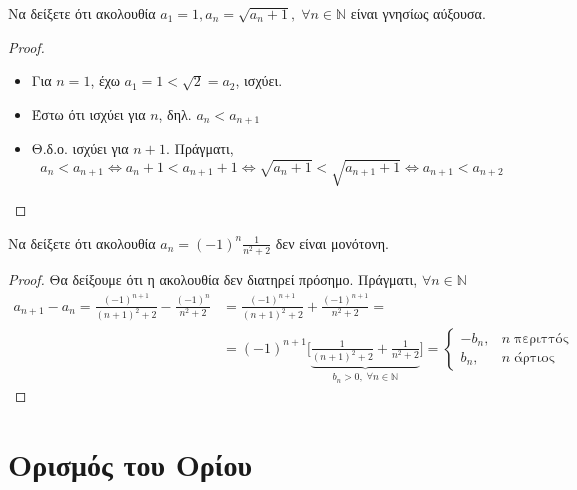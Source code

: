\begin{enumerate}
  \item Να δείξετε ότι ακολουθία $ a_{1}=1, a_{n} = \sqrt{a_{n}+1}, \; 
    \forall n \in \mathbb{N}$ είναι γνησίως αύξουσα.
    \begin{proof}
      \begin{itemize}
        \item Για $ n=1 $, έχω $ a_{1}=1 < \sqrt{2} = a_{2} $, ισχύει.
        \item Έστω ότι ισχύει για $n$, δηλ. $ a_{n}< a_{n+1} $
        \item Θ.δ.ο. ισχύει για $ n+1 $. Πράγματι,
          \[
            a_{n} < a_{n+1} \Leftrightarrow a_{n}+1 < a_{n+1}+1 
            \Leftrightarrow \sqrt{a_{n}+1} < \sqrt{a_{n+1}+1} 
            \Leftrightarrow a_{n+1}< a_{n+2}
          \] 
      \end{itemize}
    \end{proof}

  \item Να δείξετε ότι ακολουθία $ a_{n} = (-1)^{n} \frac{1}{n^{2}+2} $ 
    δεν είναι μονότονη.
    \begin{proof}
    \item {}
      Θα δείξουμε ότι η ακολουθία δεν διατηρεί πρόσημο. Πράγματι, 
      $ \forall n \in \mathbb{N} $
      \begin{align*}
        a_{n+1}- a_{n} = \frac{(-1)^{n+1}}{(n+1)^{2}+2} - 
        \frac{(-1)^{n}} {n^{2}+2} 
                        &= \frac{(-1)^{n+1}}{(n+1)^{2}+2} + 
                        \frac{(-1)^{n+1}}{n^{2}+2}= \\
                        &= (-1)^{n+1}\Biggl[\underbrace{\frac{1}{(n+1)^{2}+2} + 
                            \frac{1}{n^{2}+2}}_{b_{n} > 0, \; \forall n \in 
                        \mathbb{N}}\Biggr] 
                        = \begin{cases}
                          -b_{n}, & n \; \text{περιττός} \\
                          b_{n}, & n \; \text{άρτιος} 
                        \end{cases}
      \end{align*} 
    \end{proof}
\end{enumerate}


\section{Ορισμός του Ορίου}


